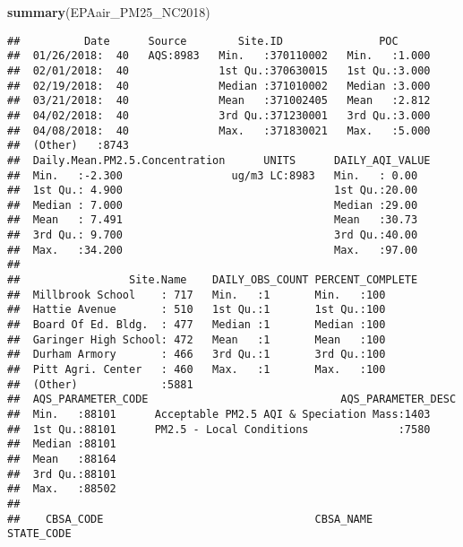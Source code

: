\documentclass[]{article}
\newenvironment{Shaded}{\begin{snugshade}}{\end{snugshade}}
\newcommand{\KeywordTok}[1]{\textcolor[rgb]{0.13,0.29,0.53}{\textbf{#1}}}
\newcommand{\NormalTok}[1]{#1}
\begin{document}
\begin{Shaded}
\begin{Highlighting}[]
\KeywordTok{summary}\NormalTok{(EPAair_PM25_NC2018)}
\end{Highlighting}
\end{Shaded}

\begin{verbatim}
##          Date      Source        Site.ID               POC       
##  01/26/2018:  40   AQS:8983   Min.   :370110002   Min.   :1.000  
##  02/01/2018:  40              1st Qu.:370630015   1st Qu.:3.000  
##  02/19/2018:  40              Median :371010002   Median :3.000  
##  03/21/2018:  40              Mean   :371002405   Mean   :2.812  
##  04/02/2018:  40              3rd Qu.:371230001   3rd Qu.:3.000  
##  04/08/2018:  40              Max.   :371830021   Max.   :5.000  
##  (Other)   :8743                                                 
##  Daily.Mean.PM2.5.Concentration      UNITS      DAILY_AQI_VALUE
##  Min.   :-2.300                 ug/m3 LC:8983   Min.   : 0.00  
##  1st Qu.: 4.900                                 1st Qu.:20.00  
##  Median : 7.000                                 Median :29.00  
##  Mean   : 7.491                                 Mean   :30.73  
##  3rd Qu.: 9.700                                 3rd Qu.:40.00  
##  Max.   :34.200                                 Max.   :97.00  
##                                                                
##                 Site.Name    DAILY_OBS_COUNT PERCENT_COMPLETE
##  Millbrook School    : 717   Min.   :1       Min.   :100     
##  Hattie Avenue       : 510   1st Qu.:1       1st Qu.:100     
##  Board Of Ed. Bldg.  : 477   Median :1       Median :100     
##  Garinger High School: 472   Mean   :1       Mean   :100     
##  Durham Armory       : 466   3rd Qu.:1       3rd Qu.:100     
##  Pitt Agri. Center   : 460   Max.   :1       Max.   :100     
##  (Other)             :5881                                   
##  AQS_PARAMETER_CODE                              AQS_PARAMETER_DESC
##  Min.   :88101      Acceptable PM2.5 AQI & Speciation Mass:1403    
##  1st Qu.:88101      PM2.5 - Local Conditions              :7580    
##  Median :88101                                                     
##  Mean   :88164                                                     
##  3rd Qu.:88101                                                     
##  Max.   :88502                                                     
##                                                                    
##    CBSA_CODE                                 CBSA_NAME      STATE_CODE

\end{verbatim}
\end{document}
